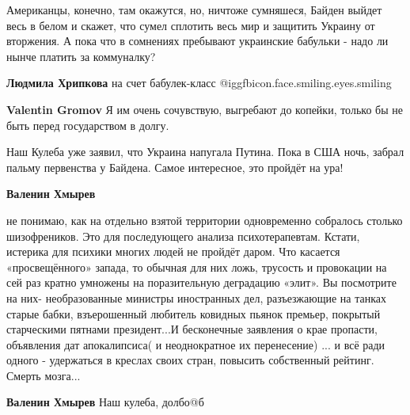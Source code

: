  
 
 
 
 
\zzSecCmt

\begin{itemize} %

Американцы, конечно, там окажутся, но, ничтоже сумняшеся, Байден выйдет весь в
белом и скажет, что сумел сплотить весь мир и защитить Украину от вторжения. А
пока что в сомнениях пребывают украинские бабульки - надо ли нынче платить за
коммуналку?

\begin{itemize} %
\textbf{Людмила Хрипкова} на счет бабулек-класс @igg{fbicon.face.smiling.eyes.smiling} 

\textbf{Valentin Gromov} Я им очень сочувствую, выгребают до копейки, только бы не быть перед государством в долгу.
\end{itemize} %


Наш Кулеба уже заявил, что Украина напугала Путина. Пока в США ночь, забрал пальму
первенства у Байдена. Самое интересное, это пройдёт на ура!

\begin{itemize} %
\textbf{Валенин Хмырев} 

не понимаю, как на отдельно взятой территории одновременно собралось столько
шизофреников. Это для последующего анализа психотерапевтам. Кстати, истерика
для психики многих людей не пройдёт даром. Что касается «просвещённого» запада,
то обычная для них ложь, трусость и провокации на сей раз кратно умножены на
поразительную деградацию «элит». Вы посмотрите на них- необразованные министры
иностранных дел, разъезжающие на танках старые бабки, взъерошенный любитель
ковидных пьянок премьер, покрытый старческими пятнами президент...И бесконечные
заявления о крае пропасти, объявления дат апокалипсиса( и неоднократное их
перенесение) ... и всё ради одного - удержаться в креслах своих стран, повысить
собственный рейтинг. Смерть мозга...

\textbf{Валенин Хмырев} Наш кулеба, долбо@б


\end{itemize}
\end{itemize}
